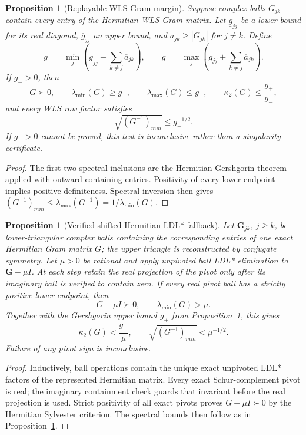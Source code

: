 \documentclass[11pt]{article}
\newtheorem{proposition}[theorem]{Proposition}
\theoremstyle{definition}
\theoremstyle{remark}
\begin{document}
\begin{proposition}[Replayable WLS Gram margin]
\label{prop:r2-gram-margin}
Suppose complex balls \(G_{jk}\) contain every entry of the Hermitian WLS Gram
matrix.  Let \(\underline g_{jj}\) be a lower bound for its real diagonal,
\(\overline g_{jj}\) an upper bound, and
\(\overline a_{jk}\ge |G_{jk}|\) for \(j\ne k\).  Define
\[
 g_-=\min_j\left(\underline g_{jj}
       -\sum_{k\ne j}\overline a_{jk}\right),\qquad
 g_+=\max_j\left(\overline g_{jj}
       +\sum_{k\ne j}\overline a_{jk}\right).
\]
If \(g_->0\), then
\[
 G\succ0,\qquad
 \lambda_{\min}(G)\ge g_-,\qquad
 \lambda_{\max}(G)\le g_+,\qquad
 \kappa_2(G)\le\frac{g_+}{g_-},
\]
and every WLS row factor satisfies
\[
 \sqrt{(G^{-1})_{mm}}\le g_-^{-1/2}.
\]
If \(g_->0\) cannot be proved, this test is inconclusive rather than a
singularity certificate.
\end{proposition}
\begin{proof}
The first two spectral inclusions are the Hermitian Gershgorin theorem applied
with outward-containing entries.  Positivity of every lower endpoint implies
positive definiteness.  Spectral inversion then gives
\((G^{-1})_{mm}\le\lambda_{\max}(G^{-1})=1/\lambda_{\min}(G)\).
\end{proof}

\begin{proposition}[Verified shifted Hermitian LDL* fallback]
\label{prop:r2-gram-ldl}
Let \(\boldsymbol G_{jk}\), \(j\ge k\), be lower-triangular complex balls
containing the corresponding entries of one exact Hermitian Gram matrix \(G\);
the upper triangle is reconstructed by conjugate symmetry.  Let \(\mu>0\) be
rational and apply unpivoted ball LDL* elimination to
\(\boldsymbol G-\mu I\).  At each step retain the real
projection of the pivot only after its imaginary ball is verified to contain
zero.  If every real pivot ball has a strictly positive lower endpoint, then
\[
 G-\mu I\succ0,\qquad \lambda_{\min}(G)>\mu.
\]
Together with the Gershgorin upper bound \(g_+\) from
Proposition~\ref{prop:r2-gram-margin}, this gives
\[
 \kappa_2(G)<\frac{g_+}{\mu},\qquad
 \sqrt{(G^{-1})_{mm}}<\mu^{-1/2}.
\]
Failure of any pivot sign is inconclusive.
\end{proposition}
\begin{proof}
Inductively, ball operations contain the unique exact unpivoted LDL* factors
of the represented Hermitian matrix.  Every exact Schur-complement pivot is
real; the imaginary containment check guards that invariant before the real
projection is used.  Strict positivity of all exact pivots proves
\(G-\mu I\succ0\) by the Hermitian Sylvester criterion.  The spectral bounds
then follow as in Proposition~\ref{prop:r2-gram-margin}.
\end{proof}
\end{document}
